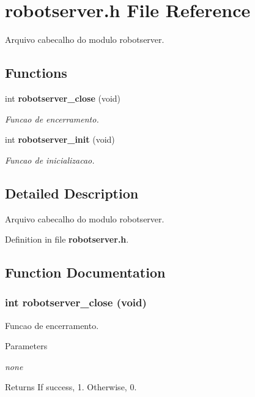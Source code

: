 \section{robotserver.h File Reference}
\label{robotserver_8h}


Arquivo cabecalho do modulo robotserver.  
\subsection*{Functions}
\begin{DoxyCompactItemize}
\item 
int {\bf robotserver\_\-close} (void)
\begin{DoxyCompactList}\small\item\em Funcao de encerramento. \item\end{DoxyCompactList}\item 
int {\bf robotserver\_\-init} (void)
\begin{DoxyCompactList}\small\item\em Funcao de inicializacao. \item\end{DoxyCompactList}\end{DoxyCompactItemize}


\subsection{Detailed Description}
Arquivo cabecalho do modulo robotserver. 

Definition in file {\bf robotserver.h}.

\subsection{Function Documentation}
\subsubsection[{robotserver\_\-close}]{\setlength{\rightskip}{0pt plus 5cm}int robotserver\_\-close (void)}\label{robotserver_8h_a03604797e6b7e5fa2bb9dec674d34548}


Funcao de encerramento. 
\begin{DoxyParams}{Parameters}
\item[{\em none}]\end{DoxyParams}
\begin{DoxyReturn}{Returns}
If success, 1. Otherwise, 0. 
\end{DoxyReturn}



